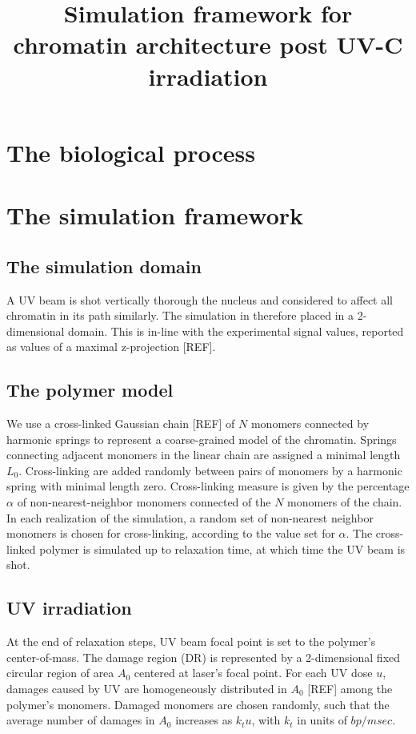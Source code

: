 \documentclass[12pt]{report}
\begin{document}
	
	\title{Simulation framework for chromatin architecture post UV-C irradiation}
	\section{The biological process}
	
	\section{The simulation framework}
	
	\subsection{The simulation domain}
	A UV beam is shot vertically thorough the nucleus and considered to affect all chromatin in its path similarly. The simulation in therefore placed in a 2-dimensional domain. This is in-line with the experimental signal values, reported as values of a maximal z-projection [REF].
	
	\subsection{The polymer model}
	We use a cross-linked Gaussian chain [REF] of $N$ monomers connected by harmonic springs to represent a coarse-grained model of the chromatin. Springs connecting adjacent monomers in the linear chain are assigned a minimal length $L_0$. Cross-linking are added randomly between pairs of monomers by a harmonic spring with minimal length zero. Cross-linking measure is given by the percentage $\alpha$ of non-nearest-neighbor monomers connected of the $N$ monomers of the chain. In each realization of the simulation, a random set of non-nearest neighbor monomers is chosen for cross-linking, according to the value set for $\alpha$. The cross-linked polymer is simulated up to relaxation time, at which time the UV beam is shot.
	
	\subsection{UV irradiation}
	At the end of relaxation steps, UV beam focal point is set to the polymer's center-of-mass. The damage region (DR) is represented by a 2-dimensional fixed circular region of area $A_0$ centered at laser's focal point. For each UV dose $u$, damages caused by UV are homogeneously distributed in $A_0$ [REF] among the polymer's monomers. Damaged monomers are chosen randomly, such that the average number of damages in $A_0$ increases as $k_tu$, with $k_t$ in units of $bp/msec$. 
	
\end{document}
